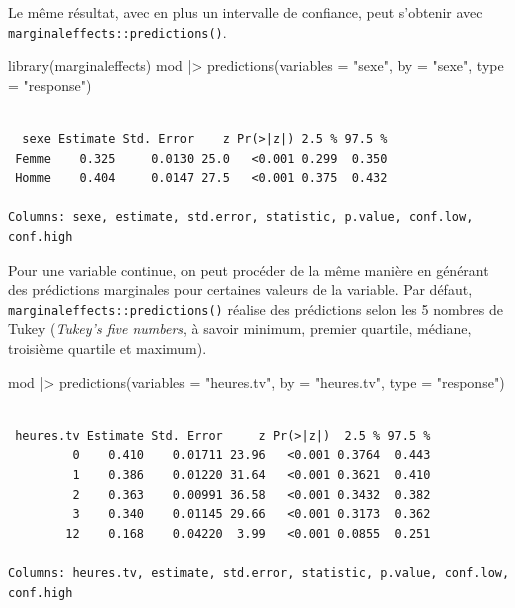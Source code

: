 \documentclass[
  letterpaper,
  DIV=11,
  numbers=noendperiod,
  oneside]{scrreprt}
\newenvironment{Shaded}{\begin{snugshade}}{\end{snugshade}}
\newcommand{\AttributeTok}[1]{\textcolor[rgb]{0.40,0.45,0.13}{#1}}
\newcommand{\FunctionTok}[1]{\textcolor[rgb]{0.28,0.35,0.67}{#1}}
\newcommand{\NormalTok}[1]{\textcolor[rgb]{0.00,0.23,0.31}{#1}}
\newcommand{\SpecialCharTok}[1]{\textcolor[rgb]{0.37,0.37,0.37}{#1}}
\newcommand{\StringTok}[1]{\textcolor[rgb]{0.13,0.47,0.30}{#1}}
\begin{document}
Le même résultat, avec en plus un intervalle de confiance, peut
s'obtenir avec \texttt{marginaleffects::predictions()}.

\begin{Shaded}
\begin{Highlighting}[]
\FunctionTok{library}\NormalTok{(marginaleffects)}
\NormalTok{mod }\SpecialCharTok{|\textgreater{}} 
  \FunctionTok{predictions}\NormalTok{(}\AttributeTok{variables =} \StringTok{"sexe"}\NormalTok{, }\AttributeTok{by =} \StringTok{"sexe"}\NormalTok{, }\AttributeTok{type =} \StringTok{"response"}\NormalTok{)}
\end{Highlighting}
\end{Shaded}

\begin{verbatim}

  sexe Estimate Std. Error    z Pr(>|z|) 2.5 % 97.5 %
 Femme    0.325     0.0130 25.0   <0.001 0.299  0.350
 Homme    0.404     0.0147 27.5   <0.001 0.375  0.432

Columns: sexe, estimate, std.error, statistic, p.value, conf.low, conf.high 
\end{verbatim}

Pour une variable continue, on peut procéder de la même manière en
générant des prédictions marginales pour certaines valeurs de la
variable. Par défaut, \texttt{marginaleffects::predictions()} réalise
des prédictions selon les 5 nombres de Tukey (\emph{Tukey's five
numbers}, à savoir minimum, premier quartile, médiane, troisième
quartile et maximum).

\begin{Shaded}
\begin{Highlighting}[]
\NormalTok{mod }\SpecialCharTok{|\textgreater{}} 
  \FunctionTok{predictions}\NormalTok{(}\AttributeTok{variables =} \StringTok{"heures.tv"}\NormalTok{, }\AttributeTok{by =} \StringTok{"heures.tv"}\NormalTok{, }\AttributeTok{type =} \StringTok{"response"}\NormalTok{)}
\end{Highlighting}
\end{Shaded}

\begin{verbatim}

 heures.tv Estimate Std. Error     z Pr(>|z|)  2.5 % 97.5 %
         0    0.410    0.01711 23.96   <0.001 0.3764  0.443
         1    0.386    0.01220 31.64   <0.001 0.3621  0.410
         2    0.363    0.00991 36.58   <0.001 0.3432  0.382
         3    0.340    0.01145 29.66   <0.001 0.3173  0.362
        12    0.168    0.04220  3.99   <0.001 0.0855  0.251

Columns: heures.tv, estimate, std.error, statistic, p.value, conf.low, conf.high 
\end{verbatim}
\end{document}
